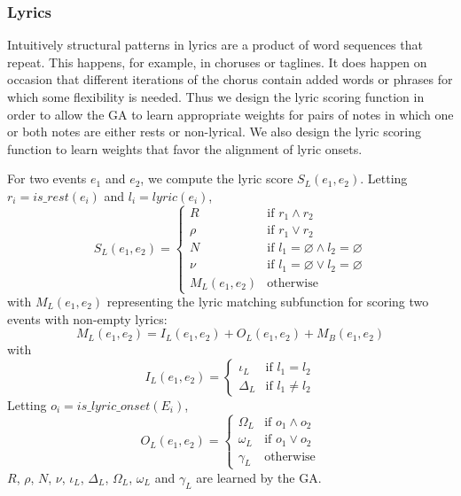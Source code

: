 \documentclass[phd,electronic,oneside,twosidetoc,letterpaper,chaptercenter,parttop,lol,lof,lot]{byumsphd}
\begin{document}

\subsubsection{Lyrics}

Intuitively structural patterns in lyrics are a product of word sequences that repeat. This happens, for example, in choruses or taglines. It does happen on occasion that different iterations of the chorus contain added words or phrases for which some flexibility is needed. Thus we design the lyric scoring function in order to allow the GA to learn appropriate weights for pairs of notes in which one or both notes are either rests or non-lyrical. We also design the lyric scoring function to learn weights that favor the alignment of lyric onsets.

For two events $e_1$ and $e_2$, we compute the lyric score $S_L(e_1,e_2)$. Letting $r_i = is\_rest(e_i)$ and $l_i = lyric(e_i)$,
\[
  S_L(e_1,e_2) =
  \begin{cases}
	R & \text{if } r_1 \land r_2 \\
	\rho & \text{if } r_1 \lor r_2 \\ 
    N & \text{if } l_1 = \varnothing \land l_2 = \varnothing\\
    \nu & \text{if } l_1 = \varnothing \lor l_2 = \varnothing \\
    M_L(e_1,e_2) & \text{otherwise}
  \end{cases}
\]
\noindent with $M_L(e_1,e_2)$ representing the lyric matching subfunction for scoring two events with non-empty lyrics:
\[ M_L(e_1,e_2) = I_L(e_1,e_2) + O_L(e_1,e_2) + M_B(e_1,e_2) \]
\noindent with
\[ I_L(e_1,e_2) = 
  \begin{cases}
  	\iota_L & \text{if } l_1 = l_2 \\
    \Delta_L & \text{if } l_1 \neq l_2
  \end{cases}
\]
\noindent Letting $o_i = is\_lyric\_onset(E_i)$,
\[ O_L(e_1,e_2) = 
  \begin{cases}
  	\Omega_L & \text{if } o_1 \land o_2 \\
    \omega_L & \text{if } o_1 \lor o_2 \\
    \gamma_L & \text{otherwise}
  \end{cases}
\]
\noindent $R$, $\rho$, $N$, $\nu$, $\iota_L$, $\Delta_L$, $\Omega_L$, $\omega_L$ and $\gamma_L$ are learned by the GA.
\end{document}
